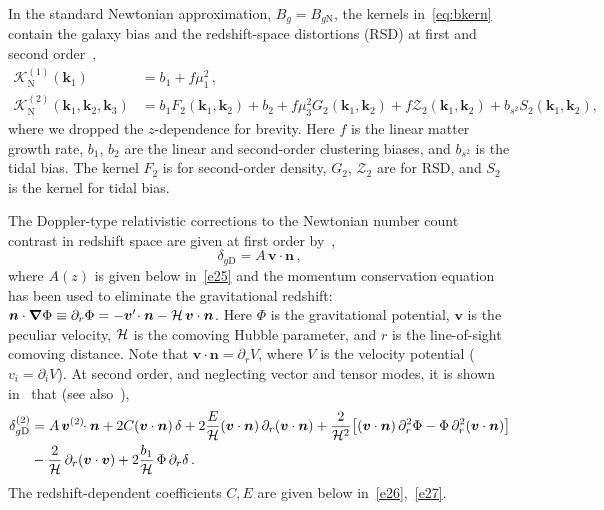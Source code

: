 In the standard Newtonian approximation, $B_g=B_{g{\mathrm{N}}}$, the kernels in~\eqref{eq:bkern} contain the galaxy bias and the redshift-space distortions (RSD) at first and second order~\cite{Bernardeau:2001qr, Karagiannis:2018jdt},
\begin{align}
\mathcal{K}^{(1)}_{\mathrm{N}}(\bm{k}_{1}) &= b_{1}+f\mu_{1}^{2}\,,  \label{e15} \\ 
{\mathcal{K}^{(2)}_{\mathrm{N}}}(\bm{k}_{1}, \bm{k}_{2},{\bm{k}_3}) &= b_{1}F_{2}(\bm{k}_{1}, \bm{k}_{2}) + b_{2} + f\mu_{3}^{2}G_{2}(\bm{k}_{1}, \bm{k}_{2}) +{f \mathcal{Z}_2}(\bm{k}_{1}, \bm{k}_{2})
+ b_{s^{2}}S_{2}(\bm{k}_{1}, \bm{k}_{2}) , \label{k2n}
\end{align}
where we dropped the $z$-dependence for brevity. Here $f$ is the linear matter growth rate, $b_1$, $b_2$ are the linear and second-order clustering biases, and $b_{s^{2}}$ is the tidal bias. The kernel $F_2$ is for second-order density, $G_2$, $\mathcal{Z}_2$ are for RSD, and $S_2$ is the kernel for tidal bias.


The Doppler-type relativistic corrections to the Newtonian number count contrast in redshift space are  given at first order by~\cite{Bonvin:2011bg},
\begin{equation}
\delta_{g\mathrm{D}} =  {A}\,\bm{v}\cdot\bm{n}\,,\label{dg1}
\end{equation}
{where $A(z)$ is given below in~\eqref{e25} and the momentum conservation equation has been used to  eliminate the gravitational redshift: $\bm{n}\cdot\bm{\nabla}\Phi\equiv \partial_r \Phi = -\bm{v}'\!\cdot\bm{n}-\mathcal{H}\,\bm{v}\cdot\bm{n} $.} Here $\Phi$ is the gravitational potential, $\bm{v}$ is the peculiar velocity,  $\mathcal{H}$ is the comoving Hubble parameter, and $r$ is the line-of-sight comoving distance.
Note that $\bm{v}\cdot\bm{n}=\partial_r V$, where $V$ is the velocity potential ($v_i=\partial_iV$). 
At second order, and neglecting vector and tensor modes, it is shown in~\cite{Clarkson:2018dwn}  that (see also~\cite{DiDio:2018zmk}),
\begin{align}
\delta^{(2)}_{g{\mathrm{D}}}&= A\, \bm{v}^{(2)}\!\!\cdot\bm{n}+2{C}(\bm{v}\cdot\bm{n})\,\delta +2 \frac{{E}}{\mathcal{H}}(\bm{v}\cdot\bm{n})\,\partial_r(\bm{v}\cdot\bm{n})
+ \frac{2}{\mathcal{H}^2}\big[(\bm{v}\cdot\bm{n}) \,\partial_r^2\Phi-\Phi\, \partial_r^2 (\bm{v}\cdot\bm{n}) \big]
\nonumber\\ \label{eq:dgsecond}
& - \frac{2}{\mathcal{H}}\,\partial_r (\bm{v}\cdot\bm{v}) + 2 \frac{b_1}{\mathcal{H}}\,\Phi\, \partial_r\delta \,. 
\end{align}
The redshift-dependent coefficients $C,E$ are  given below in~\eqref{e26},~\eqref{e27}.


